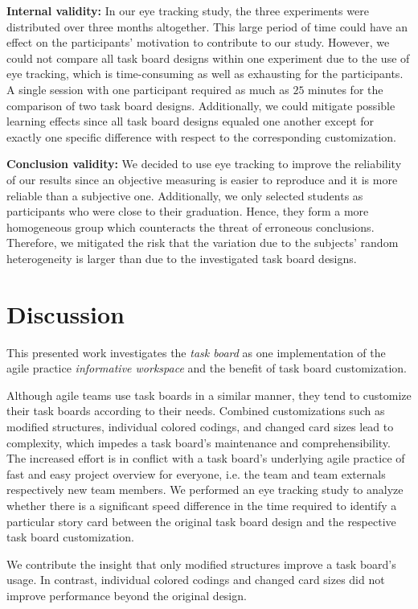 \documentclass{llncs}
\begin{document}
\textbf{Internal validity:}
In our eye tracking study, the three experiments were distributed over three 
months altogether. This large period of time could have an effect on the 
participants' motivation to contribute to our study. However, we could not 
compare all task board designs within one experiment due to the use of eye 
tracking, which is time-consuming as well as exhausting for the participants. A 
single session with one participant required as much as $25$ minutes for the 
comparison of two task board designs. Additionally, we could mitigate possible 
learning effects since all task board designs equaled one another except for 
exactly one specific difference with respect to the corresponding customization.

\textbf{Conclusion validity:}
We decided to use eye tracking to improve the reliability of our results since an objective measuring is easier to reproduce and it is more reliable than a subjective one.
Additionally, we only selected students as participants who were close to their 
graduation. Hence, they form a more homogeneous group which counteracts the 
threat of erroneous conclusions. Therefore, we mitigated the risk that the 
variation due to the subjects' random heterogeneity is larger than due to 
the investigated task board designs.

\section{Discussion}
\label{sec:discussion}
This presented work investigates the \textit{task board} as one implementation 
of the agile practice \textit{informative workspace} and the benefit of task 
board customization.

Although agile teams use task boards in a similar manner, they tend to 
customize their task boards according to their needs. Combined customizations 
such as modified structures, individual colored codings, and changed card sizes 
lead to complexity, which impedes a task board's maintenance and 
comprehensibility. The increased effort is in conflict with a task board's 
underlying agile practice of fast and easy project overview for everyone, i.e. 
the team and team externals respectively new team members.
We performed an eye tracking study to analyze whether there is a significant 
speed difference in the time required to identify a particular story card 
between the original task board design and the respective task board 
customization.

We contribute the insight that only modified structures improve a task board's 
usage. In contrast, individual colored codings and changed card sizes did not 
improve performance beyond the original design.
\end{document}
